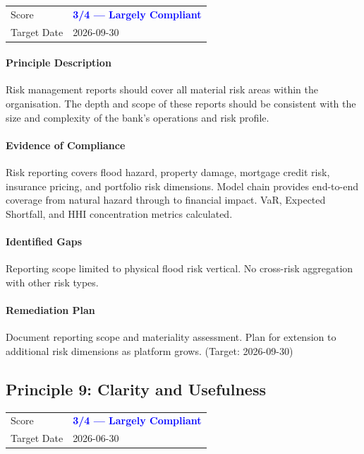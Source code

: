 \documentclass[11pt]{article}
\begin{document}
\begin{table}[H]
    \centering
    \begin{tabular}{ll}
        \toprule
        Score & \textcolor{blue}{\textbf{3/4 --- Largely Compliant}} \\
        Target Date & 2026-09-30 \\
        \bottomrule
    \end{tabular}
\end{table}

\paragraph{Principle Description}
Risk management reports should cover all material risk areas within the organisation. The depth and scope of these reports should be consistent with the size and complexity of the bank's operations and risk profile.

\paragraph{Evidence of Compliance}
Risk reporting covers flood hazard, property damage, mortgage credit risk, insurance pricing, and portfolio risk dimensions. Model chain provides end-to-end coverage from natural hazard through to financial impact. VaR, Expected Shortfall, and HHI concentration metrics calculated.

\paragraph{Identified Gaps}
Reporting scope limited to physical flood risk vertical. No cross-risk aggregation with other risk types.

\paragraph{Remediation Plan}
Document reporting scope and materiality assessment. Plan for extension to additional risk dimensions as platform grows. (Target: 2026-09-30)

\subsection{Principle 9: Clarity and Usefulness}

\begin{table}[H]
    \centering
    \begin{tabular}{ll}
        \toprule
        Score & \textcolor{blue}{\textbf{3/4 --- Largely Compliant}} \\
        Target Date & 2026-06-30 \\
        \bottomrule
    \end{tabular}
\end{table}
\end{document}
